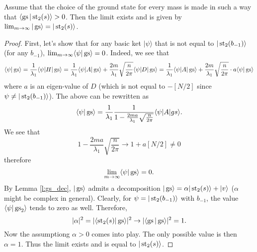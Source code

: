 \begin{proposition}
Assume that the choice of the ground state for every mass is made in such a way that $\langle \operatorname{gs}|\operatorname{st}_2(s)\rangle > 0$. Then
the limit exists and is given by $\lim_{m\rightarrow \infty} |\operatorname{gs}\rangle = |\operatorname{st}_2(s)\rangle$.
\end{proposition}
\begin{proof}
First, let's show that for any basic ket $|\psi\rangle$ that is not equal to $|\operatorname{st}_2(b_{-1})\rangle$ (for any $b_{-1}$), $\lim_{m \rightarrow \infty} \langle \psi | \operatorname{gs}\rangle = 0$. Indeed, we see that
\[
\langle \psi | \operatorname{gs} \rangle = \frac{1}{\lambda_1} \langle \psi | H|\operatorname{gs}\rangle = \frac{1}{\lambda_1} \langle \psi |A|\operatorname{gs}\rangle + \frac{2m}{\lambda_1} \sqrt{\frac{n}{2\pi}} \langle \psi | D | \operatorname{gs} \rangle = \frac{1}{\lambda_1} \langle \psi |A|\operatorname{gs}\rangle + \frac{2m}{\lambda_1} \sqrt{\frac{n}{2\pi}} \cdot a \langle \psi | \operatorname{gs} \rangle
\]
where $a$ is an eigen-value of $D$ (which is not equal to $-[N/2]$ since $\psi \neq |\operatorname{st}_2(b_{-1})\rangle$). The above can be rewritten as
\[
\langle \psi | \operatorname{gs}\rangle = \frac{1}{\lambda_1} \frac{1}{1- \frac{2ma}{\lambda_1}\sqrt{\frac{n}{2\pi}} } \langle \psi | A | gs\rangle.
\]
We see that 
\[
1- \frac{2ma}{\lambda_1}\sqrt{\frac{n}{2\pi}} \rightarrow 1 + a [N/2] \neq 0
\]
therefore
\[
\lim_{m \rightarrow \infty}\langle \psi | \operatorname{gs} \rangle = 0.
\]
By Lemma \ref{l:gs_dec}, $|\operatorname{gs}\rangle$ admits a decomposition $|\operatorname{gs}\rangle = \alpha|\operatorname{st}_2(s)\rangle + |v\rangle$ ($\alpha$ might be complex in general). Clearly, for $\psi = |\operatorname{st}_2(b_{-1})\rangle$ with $b_{-1}$, the value $\langle \psi | \operatorname{gs}_2\rangle$ tends to zero as well. Therefore,
\[
|\alpha|^2 = |\langle \operatorname{st}_2(s) | \operatorname{gs} \rangle|^2 \rightarrow |\langle \operatorname{gs} | \operatorname{gs} \rangle|^2 =1.
\]
Now the assumptiong $\alpha > 0$ comes into play. The only possible value is then $\alpha = 1$. Thus the limit exists and is equal to $|\operatorname{st}_2(s)\rangle$.
\end{proof}
